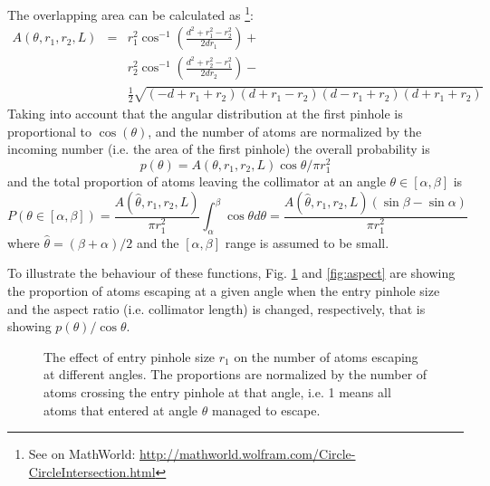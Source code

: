\documentclass[10pt,a4paper]{article}
\begin{document}
The overlapping area can be calculated as \footnote{See on MathWorld: \url{http://mathworld.wolfram.com/Circle-CircleIntersection.html}}:
\begin{eqnarray}
A(\theta, r_1, r_2, L) &=& r_1^2 \cos^{-1}\left(\frac{d^2+r_1^2-r_2^2}{2 d r_1}\right) + \nonumber\\
  & & r_2^2 \cos^{-1}\left(\frac{d^2+r_2^2-r_1^2}{2 d r_2}\right) - \nonumber\\
  & & \frac{1}{2} \sqrt{(-d+r_1+r_2)(d+r_1-r_2)(d-r_1+r_2)(d+r_1+r_2)}
\label{eq:overlaparea}
\end{eqnarray}
Taking into account that the angular distribution at the first pinhole is proportional to $\cos(\theta)$, and the number of atoms are normalized by the incoming number (i.e. the area of the first pinhole) the overall probability is
\begin{equation}
p(\theta) = A(\theta, r_1, r_2, L) \cos\theta / \pi r_1^2
\label{eq:angleprop}
\end{equation}
and the total proportion of atoms leaving the collimator at an angle $\theta \in [\alpha, \beta]$ is
\begin{equation}
P(\theta\in[\alpha, \beta]) = \frac{A(\hat \theta, r_1, r_2, L)}{\pi r_1^2} \int_{\alpha}^{\beta}\cos\theta d\theta 
                   = \frac{A(\hat \theta, r_1, r_2, L)\left(\sin\beta - \sin\alpha\right)}{\pi r_1^2} 
\label{eq:outprop}
\end{equation}
where $\hat \theta = (\beta + \alpha)/2$ and the $[\alpha,  \beta]$ range is assumed to be small.

To illustrate the behaviour of these functions, Fig. \ref{fig:entrysize} and \ref{fig:aspect} are showing the proportion of atoms escaping at a given angle when the entry pinhole size and the aspect ratio (i.e. collimator length) is changed, respectively, that is showing $p(\theta)/ \cos\theta$.

\begin{figure}[ht]
\centering
{}
\caption{The effect of entry pinhole size $r_1$ on the number of atoms escaping at different angles. The proportions are normalized by the number of atoms crossing the entry pinhole at that angle, i.e. 1 means all atoms that entered at angle $\theta$ managed to escape.}
\label{fig:entrysize}
\end{figure}
\end{document}
